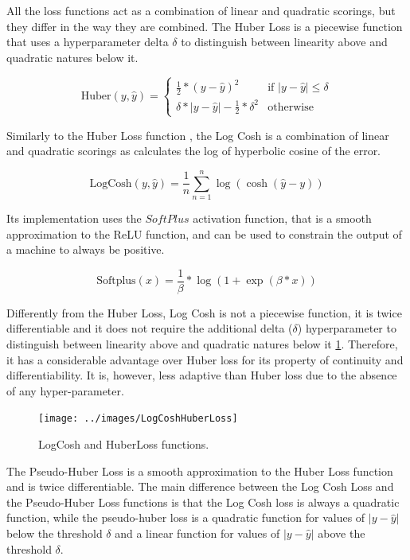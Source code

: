 All the loss functions act as a combination of linear and quadratic scorings, but they differ in the way they are combined.
The Huber Loss is a piecewise function that uses a hyperparameter delta $\delta$ to distinguish between linearity above and quadratic natures below it.

\begin{equation}
\label{eq:huber}
    \text{Huber}(y, \hat{y}) = \begin{cases}
    \frac{1}{2} \ast (y - \hat{y})^2 & \text{if } |y - \hat{y}| \leq \delta \\
    \delta \ast |y - \hat{y}| - \frac{1}{2} \ast \delta^2 & \text{otherwise}
    \end{cases}
\end{equation}

Similarly to the Huber Loss function \cite{huber1964robust}, the Log Cosh is a combination of linear and quadratic scorings as calculates the log of hyperbolic cosine of the error.

\begin{equation}
\label{eq:logcosh}
    \text{LogCosh}(y, \hat{y}) = \frac{1}{n} \sum_{n = 1}^{n} \log(\cosh(\hat{y} - y))
\end{equation}

Its implementation uses the $SoftPlus$ activation function, that is a smooth approximation to the ReLU function, and can be used to constrain the output of a machine to always be positive.

\begin{equation}
    \label{eq:softplus}
    \text{Softplus}(x) = \frac{1}{\beta} \ast \log(1 + \exp(\beta \ast x))
\end{equation}

Differently from the Huber Loss, Log Cosh is not a piecewise function, it is twice differentiable and it does not require the additional delta ($\delta$) hyperparameter to distinguish between linearity above and quadratic natures below it \ref{fig:LogCoshHuberLoss}.
Therefore, it has a considerable advantage over Huber loss for its property of continuity and differentiability.
It is, however, less adaptive than Huber loss due to the absence of any hyper-parameter.

\begin{figure}[t!]
    \texttt{[image: ../images/LogCoshHuberLoss]}
    \caption{LogCosh and HuberLoss functions.}
    \label{fig:LogCoshHuberLoss}
    \centering
\end{figure}

The Pseudo-Huber Loss is a smooth approximation to the Huber Loss function and is twice differentiable.
The main difference between the Log Cosh Loss and the Pseudo-Huber Loss functions is that the Log Cosh loss is always a quadratic function, while the pseudo-huber loss is a quadratic function for values of $|y - \hat{y}|$ below the threshold $\delta$ and a linear function for values of $|y - \hat{y}|$ above the threshold $\delta$.

